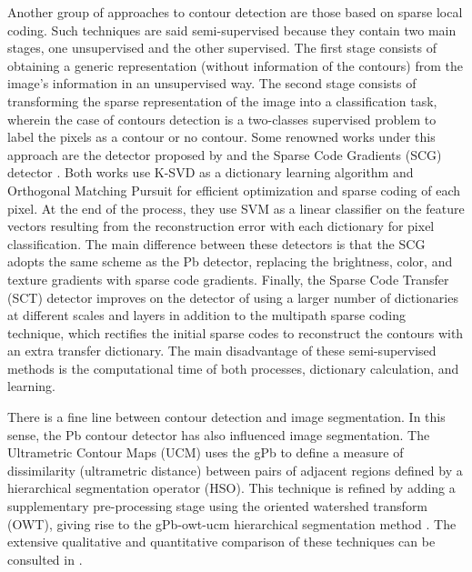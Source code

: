 Another group of approaches to contour detection are those based on sparse local coding. Such techniques are said semi-supervised because they contain two main stages, one unsupervised and the other supervised. The first stage consists of obtaining a generic representation (without information of the contours) from the image's information in an unsupervised way. The second stage consists of transforming the sparse representation of the image into a classification task, wherein the case of contours detection is a two-classes supervised problem to label the pixels as a contour or no contour. Some renowned works under this approach are the detector proposed by \cite{Mairal.Leordeanu.ea:ECCV:2008} and the Sparse Code Gradients (SCG) detector \citep{Ren.Bo:NIPS:2012}. Both works use K-SVD as a dictionary learning algorithm and Orthogonal Matching Pursuit for efficient optimization and sparse coding of each pixel. At the end of the process, they use SVM as a linear classifier on the feature vectors resulting from the reconstruction error with each dictionary for pixel classification. The main difference between these detectors is that the SCG adopts the same scheme as the Pb detector, replacing the brightness, color, and texture gradients with sparse code gradients. Finally, the Sparse Code Transfer (SCT) detector \citep{Maire.Yu.ea:ACCV:2014} improves on the detector of \cite{Mairal.Leordeanu.ea:ECCV:2008} using a larger number of dictionaries at different scales and layers in addition to the multipath sparse coding technique, which rectifies the initial sparse codes to reconstruct the contours with an extra transfer dictionary. The main disadvantage of these semi-supervised methods is the computational time of both processes, dictionary calculation, and learning. 

There is a fine line between contour detection and image segmentation. In this sense, the Pb contour detector has also influenced image segmentation. The Ultrametric Contour Maps (UCM) \citep{Arbelaez.Maire.ea:PR:2009} uses the gPb to define a measure of dissimilarity (ultrametric distance) between pairs of adjacent regions defined by a hierarchical segmentation operator (HSO). This technique is refined by adding a supplementary pre-processing stage using the oriented watershed transform (OWT), giving rise to the gPb-owt-ucm hierarchical segmentation method \citep{Arbelaez.Maire.ea:PR:2009}. The extensive qualitative and quantitative comparison of these techniques can be consulted in \citep{Arbelaez.Maire.ea:PAMI:2011}.

